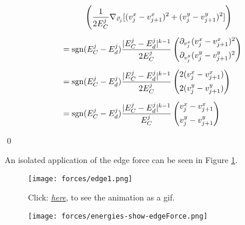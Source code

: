 \begin{proposition}
\begin{align*}
		& \hspace{1cm} \left(\frac{1}{2 E^{j}_C} \nabla_{\vec{v}_j} [(v_{j}^{x} - v_{j+1}^{x})^2 + (v_{j}^{y} - v_{j+1}^{y})^2]\right) \\[0.5em] 
		&= \operatorname{sgn}(E^{j}_C - E^{j}_d) \frac{|E^{j}_C - E^{j}_d|^{k-1}}{2 E^{j}_C} \begin{pmatrix}
			\partial_{v_{j}^{x}} (v_{j}^{x} - v_{j+1}^{x})^2 \\[0.5em]
			\partial_{v_{j}^{y}} (v_{j}^{y} - v_{j+1}^{y})^2
		\end{pmatrix} \\[0.5em]
		&= \operatorname{sgn}(E^{j}_C - E^{j}_d) \frac{|E^{j}_C - E^{j}_d|^{k-1}}{2 E^{j}_C} \begin{pmatrix}
			2(v_{j}^{x} - v_{j+1}^{x}) \\[0.5em]
			2(v_{j}^{y} - v_{j+1}^{y})
		\end{pmatrix} \\[0.5em]
		&= \operatorname{sgn}(E^{j}_C - E^{j}_d) \frac{ |E^{j}_C - E^{j}_d|^{k-1}}{E^{j}_C} \begin{pmatrix}
				v_{j}^{x} - v_{j+1}^{x} \\[0.5em]
				v_{j}^{y} - v_{j+1}^{y}
		\end{pmatrix}
	\end{align*}
	
	

	\qed  
\end{proposition}

An isolated application of the edge force can be seen in Figure \ref{fig:edgeForce}.  

\begin{figure}
	\begin{center}
		\texttt{[image: forces/edge1.png]}
		\caption{Click: \href{https://github.com/tivo476c/FlexibleCellModel/blob/master/figures/gifs/showForces/show-edgeForce.gif}{\textit{here}}, to see the animation as a gif.
		}
		\label{fig:edgeForce}
	\end{center}
\end{figure}

\begin{figure}
	\begin{center}
		\texttt{[image: forces/energies-show-edgeForce.png]}
		\caption{}
		\label{fig:edgeEnergy}
	\end{center}
\end{figure}

